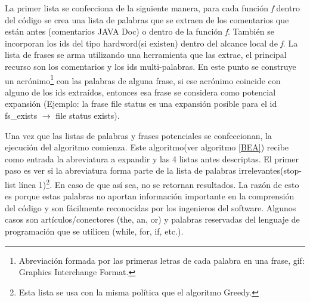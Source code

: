 \documentclass[a4paper,12pt]{report}
\begin{document}
La primer lista se confecciona de la siguiente manera, para cada función \textit{f} dentro del código se crea una lista de palabras que se extraen de los comentarios que están antes (comentarios JAVA Doc) o dentro de la función \textit{f}. También se incorporan los ids del tipo hardword(si existen) dentro del alcance local de \textit{f}. La lista de frases se arma utilizando una herramienta que las extrae\cite{FFCW01}, el principal recurso son los comentarios y los ids multi-palabras. En este punto se construye un acrónimo\footnote[1]{Abreviación formada por las primeras letras de cada palabra en una frase, gif: Graphics Interchange Format.} con las palabras de alguna frase, si ese acrónimo coincide con alguno de los ids extraídos, entonces esa frase se considera como potencial expansión (Ejemplo: la frase \textsf{file status} es una expansión posible para el id \textsf{fs\_exists} $\rightarrow$ \textsf{file status exists}).

Una vez que las listas de palabras y frases potenciales se confeccionan, la ejecución del algoritmo comienza. Este algoritmo(ver algoritmo \ref{BEA}) recibe como entrada la abreviatura a expandir y las 4 listas antes descriptas. El primer paso es ver si la abreviatura forma parte de la lista de palabras irrelevantes(stop-list línea 1)\footnote[2]{Esta lista se usa con la misma política que el algoritmo Greedy.}. En caso de que así sea, no se retornan resultados. La razón de esto es porque estas palabras no aportan información importante en la comprensión del código y son fácilmente reconocidas por los ingenieros del software. Algunos casos son artículos/conectores (the, an, or) y palabras reservadas del lenguaje de programación que se utilicen (\textsf{while, for, if,} etc.).
\end{document}
